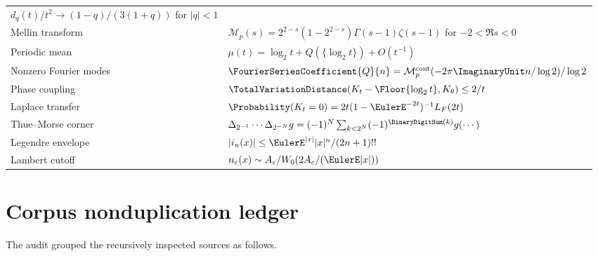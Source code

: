 \documentclass[11pt,oneside]{article}
\theoremstyle{definition}
\theoremstyle{remark}
\newcommand{\Mcal}{\mathcal M}
\begin{document}
\begin{longtable}{@{}p{}p{}@{}}
$d_q(t)/t^2\to(1-q)/(3(1+q))$ for $|q|<1$ \\
Mellin transform
& $\Mcal_p(s)=2^{2-s}(1-2^{2-s})\Gamma(s-1)\zeta(s-1)$ for $-2<\Re s<0$ \\
Periodic mean
& $\mu(t)=\log_2t+Q(\{\log_2t\})+O(t^{-1})$ \\
Nonzero Fourier modes
& $\FourierSeriesCoefficient{Q}{n}=\Mcal_p^{\mathrm{cont}}(-2\pi\ImaginaryUnit n/\log2)/\log2$ \\
Phase coupling
& $\TotalVariationDistance(K_t-\Floor{\log_2t},K_\theta)\le2/t$ \\
Laplace transfer
& $\Probability(K_t=0)=2t(1-\EulerE^{-2t})^{-1}L_F(2t)$ \\
Thue--Morse corner
& $\Delta_{2^{-1}}\cdots\Delta_{2^{-N}}g=(-1)^N\sum_{k<2^N}(-1)^{\BinaryDigitSum(k)}g(\cdots)$ \\
Legendre envelope
& $|i_n(x)|\le\EulerE^{|x|}|x|^n/(2n+1)!!$ \\
Lambert cutoff
& $n_\varepsilon(x)\sim A_\varepsilon/W_0(2A_\varepsilon/(\EulerE|x|))$ \\
\bottomrule
\end{longtable}

\section{Corpus nonduplication ledger}
\label{app:audit}

The audit grouped the recursively inspected sources as follows.
\end{document}
